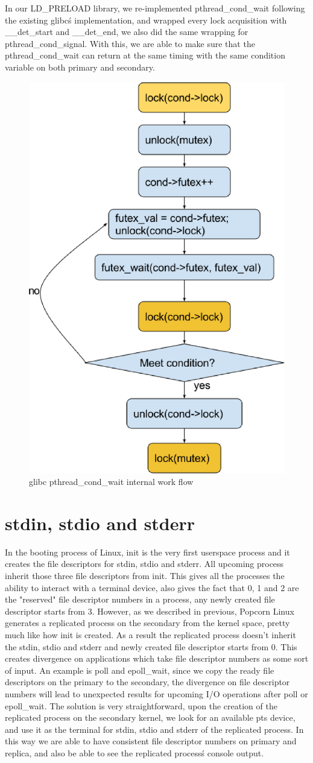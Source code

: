 \newpage

In our LD\_PRELOAD library, we re-implemented pthread\_cond\_wait following the existing glibc\'s implementation, and wrapped every lock acquisition with \_\_det\_start and \_\_det\_end, we also did the same wrapping for pthread\_cond\_signal. With this, we are able to make sure that the pthread\_cond\_wait can return at the same timing with the same condition variable on both primary and secondary.

\begin{figure}
\centering
\includegraphics[width=0.4\columnwidth]{figures/cond_wait}
\caption{glibc pthread\_cond\_wait internal work flow}
\label{f:cond_wait}
\end{figure}

\section{stdin, stdio and stderr} \label{chap:stdxxx}

In the booting process of Linux, init is the very first userspace process and it creates the file descriptors for stdin, stdio and stderr. All upcoming process inherit those three file descriptors from init. This gives all the processes the ability to interact with a terminal device, also gives the fact that 0, 1 and 2 are the "reserved" file descriptor numbers in a process, any newly created file descriptor starts from 3. However, as we described in previous, Popcorn Linux generates a replicated process on the secondary from the kernel space, pretty much like how init is created. As a result the replicated process doesn't inherit the stdin, stdio and stderr and newly created file descriptor starts from 0. This creates divergence on applications which take file descriptor numbers as some sort of input. An example is poll and epoll\_wait, since we copy the ready file descriptors on the primary to the secondary, the divergence on file descriptor numbers will lead to unexpected results for upcoming I/O operations after poll or epoll\_wait. The solution is very straightforward, upon the creation of the replicated process on the secondary kernel, we look for an available pts device, and  use it as the terminal for stdin, stdio and stderr of the replicated process. In this way we are able to have consistent file descriptor numbers on primary and replica, and also be able to see the replicated process\'s console output.

